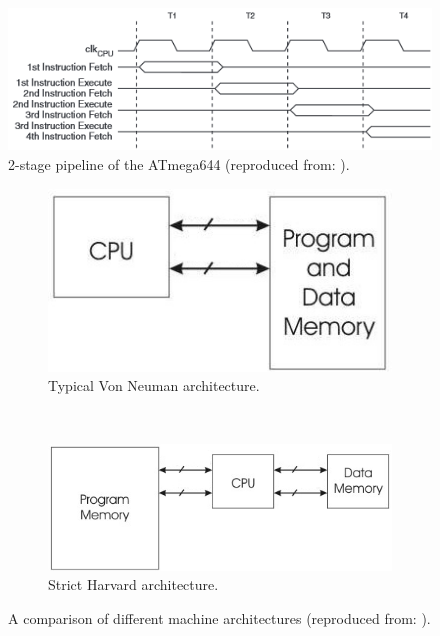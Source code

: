 	\begin{figure}
		\center
		\includegraphics[scale=0.6]{img/pipeline.png}
		\caption{\footnotesize 2-stage pipeline of the ATmega644 (reproduced from: \protect\citep{atmega_manual}).}
		\label{fig:pipeline}		
	\end{figure}
	
\begin{figure}
	\begin{subfigure}{0.5\textwidth}
		\center
		\includegraphics[scale=0.5]{img/von_neuman_arch.jpg}
		\caption{\footnotesize Typical Von Neuman architecture.}
		\label{fig:VN_arch}
	\end{subfigure} 
	~
	\begin{subfigure}{0.5\textwidth}
		\center
		\includegraphics[scale=0.5]{img/harvard_arch.jpeg}
		\caption{\footnotesize Strict Harvard architecture.}
		\label{fig:H_arch}
	\end{subfigure}
	\caption{\footnotesize A comparison of different machine architectures (reproduced from: \protect\citep{website:mcu_primer}).}
	\label{fig:architectures}
\end{figure}	
	
